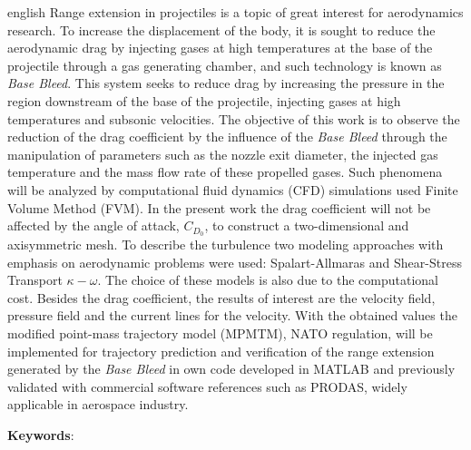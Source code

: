 \begin{resumo}[Abstract]
 \begin{otherlanguage*}{english}
\SingleSpacing
Range extension in projectiles is a topic of great interest for aerodynamics research. To increase the displacement of the body, it is sought to reduce the aerodynamic drag by injecting gases at high temperatures at the base of the projectile through a gas generating chamber, and such technology is known as \textit{Base Bleed}. This system seeks to reduce drag by increasing the pressure in the region downstream of the base of the projectile, injecting gases at high temperatures and subsonic velocities. The objective of this work is to observe the reduction of the drag coefficient by the influence of the \textit{Base Bleed} through the manipulation of parameters such as the nozzle exit diameter, the injected gas temperature and the mass flow rate of these propelled gases. Such phenomena will be analyzed by computational fluid dynamics (CFD) simulations used Finite Volume Method (FVM). In the present work the drag coefficient will not be affected by the angle of attack, $C_{D_{0}}$, to construct a two-dimensional and axisymmetric mesh.
To describe the turbulence two modeling approaches with emphasis on aerodynamic problems were used: Spalart-Allmaras and Shear-Stress Transport $\kappa-\omega$. The choice of these models is also due to the computational cost. Besides the drag coefficient, the results of interest are the velocity field, pressure field and the current lines for the velocity. With the obtained values the modified point-mass trajectory model (MPMTM), NATO regulation, will be implemented for trajectory prediction and verification of the range extension generated by the \textit{Base Bleed} in own code developed in MATLAB and previously validated with commercial software references such as PRODAS, widely applicable in aerospace industry.

   \vspace{\onelineskip}
 
   \noindent 
   \textbf{Keywords}: \imprimirkeywords
 \end{otherlanguage*}
\end{resumo}